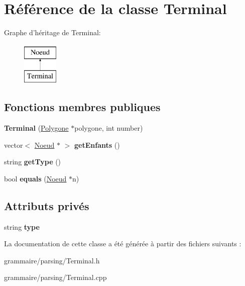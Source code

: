 \hypertarget{class_terminal}{\section{Référence de la classe Terminal}
\label{class_terminal}
}
Graphe d'héritage de Terminal\-:\begin{figure}[H]
\begin{center}
\leavevmode
\includegraphics[height=2.000000cm]{class_terminal}
\end{center}
\end{figure}
\subsection*{Fonctions membres publiques}
\begin{DoxyCompactItemize}
\item 
\hypertarget{class_terminal_a221ebc6bdede0a9a032a0f0a98fb6e52}{{\bfseries Terminal} (\hyperlink{class_polygone}{Polygone} $\ast$polygone, int number)}\label{class_terminal_a221ebc6bdede0a9a032a0f0a98fb6e52}

\item 
\hypertarget{class_terminal_a3a91bb783ae607efd0a42b2707ca6493}{vector$<$ \hyperlink{class_noeud}{Noeud} $\ast$ $>$ {\bfseries get\-Enfants} ()}\label{class_terminal_a3a91bb783ae607efd0a42b2707ca6493}

\item 
\hypertarget{class_terminal_a07e1cf40f0889f07b3b9ec78e29b480b}{string {\bfseries get\-Type} ()}\label{class_terminal_a07e1cf40f0889f07b3b9ec78e29b480b}

\item 
\hypertarget{class_terminal_a522310dd9ed87cb320c45c109610ac12}{bool {\bfseries equals} (\hyperlink{class_noeud}{Noeud} $\ast$n)}\label{class_terminal_a522310dd9ed87cb320c45c109610ac12}

\end{DoxyCompactItemize}
\subsection*{Attributs privés}
\begin{DoxyCompactItemize}
\item 
\hypertarget{class_terminal_a4cdd1bfc11e15f5b287ff3e4de29bc9e}{string {\bfseries type}}\label{class_terminal_a4cdd1bfc11e15f5b287ff3e4de29bc9e}

\end{DoxyCompactItemize}


La documentation de cette classe a été générée à partir des fichiers suivants \-:\begin{DoxyCompactItemize}
\item 
grammaire/parsing/Terminal.\-h\item 
grammaire/parsing/Terminal.\-cpp\end{DoxyCompactItemize}
